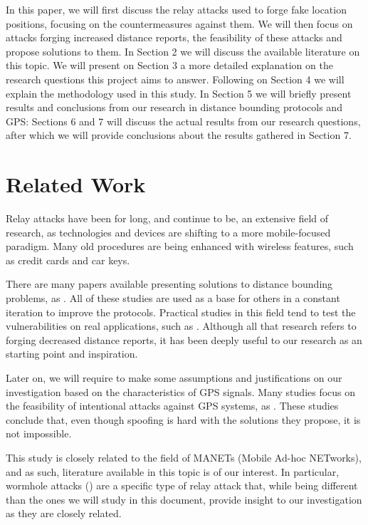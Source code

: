 \documentclass{article}
\begin{document}
In this paper, we will first discuss the relay attacks used to forge fake location positions, focusing on the countermeasures against them. We will then focus on attacks forging increased distance reports, the feasibility of these attacks and propose solutions to them. In Section 2 we will discuss the available literature on this topic. We will present on Section 3 a more detailed explanation on the research questions this project aims to answer. Following on Section 4 we will explain the methodology used in this study. In Section 5 we will briefly present results and conclusions from our research in distance bounding protocols and GPS: Sections 6 and 7 will discuss the actual results from our research questions, after which we will provide conclusions about the results gathered in Section 7.

\section{Related Work}

Relay attacks have been for long, and continue to be, an extensive field of research, as technologies and devices are shifting to a more mobile-focused paradigm. Many old procedures are being enhanced with wireless features, such as credit cards and car keys.

There are many papers available presenting solutions to distance bounding problems, as \cite{brands1994distance, tu2007rfid, rasmussen2010realization}. All of these studies are used as a base for others in a constant iteration to improve the protocols. Practical studies in this field tend to test the vulnerabilities on real applications, such as \cite{francillon2011relay, francis2010practical, hancke2005practical, markantonakis2012practical, vandenbreekel2014relay}. Although all that research refers to forging decreased distance reports, it has been deeply useful to our research as an starting point and inspiration.

Later on, we will require to make some assumptions and justifications on our investigation based on the characteristics of GPS signals. Many studies focus on the feasibility of intentional attacks against GPS systems, as \cite{warner2003gps, wen2005countermeasures, jafarnia2012gps}. These studies conclude that, even though spoofing is hard with the solutions they propose, it is not impossible.

This study is closely related to the field of MANETs (Mobile Ad-hoc NETworks), and as such, literature available in this topic is of our interest. In particular, wormhole attacks (\cite{hu2006wormhole, maheshwari2007detecting}) are a specific type of relay attack that, while being different than the ones we will study in this document, provide insight to our investigation as they are closely related.
\end{document}
